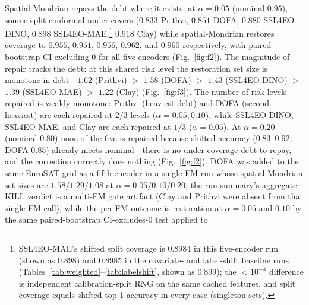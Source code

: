 \documentclass[journal]{IEEEtran}
\renewcommand{\_}{\textunderscore\allowbreak}
\begin{document}
Spatial-Mondrian repays the debt where it exists: at $\alpha=0.05$ (nominal $0.95$), source
split-conformal under-covers ($0.833$ Prithvi, $0.851$ DOFA, $0.880$ SSL4EO-DINO, $0.898$ SSL4EO-MAE,\footnote{%
SSL4EO-MAE's shifted split coverage is $0.8984$ in this five-encoder run (shown as $0.898$) and $0.8985$ in the
covariate- and label-shift baseline runs (Tables~\ref{tab:weighted}--\ref{tab:labelshift}, shown as $0.899$);
the ${<}10^{-4}$ difference is independent calibration-split RNG on the same cached features, and split coverage
equals shifted top-1 accuracy in every case (singleton sets).} $0.918$ Clay)
while spatial-Mondrian restores coverage to $0.955$, $0.951$, $0.956$, $0.962$, and $0.960$ respectively,
with paired-bootstrap CI excluding $0$ for all five encoders (Fig.~\ref{fig:f2}). The magnitude of repair tracks the debt:
at this shared risk level the restoration set size is monotone in debt---$1.62$ (Prithvi) $>$ $1.58$ (DOFA) $>$ $1.43$
(SSL4EO-DINO) $>$ $1.39$ (SSL4EO-MAE) $>$ $1.22$ (Clay) (Fig.~\ref{fig:f3}).
The number of risk levels repaired is weakly monotone: Prithvi (heaviest debt) and DOFA (second-heaviest) are each repaired at $2/3$
levels ($\alpha=0.05,0.10$), while SSL4EO-DINO, SSL4EO-MAE, and Clay are each repaired at $1/3$ ($\alpha=0.05$). At
$\alpha=0.20$ (nominal $0.80$) none of the five is repaired because shifted accuracy ($0.83$--$0.92$, DOFA $0.85$) already meets
nominal---there is no under-coverage debt to repay, and the correction correctly does nothing
(Fig.~\ref{fig:f2}). DOFA was added to the same EuroSAT grid as a fifth encoder in a single-FM run whose
spatial-Mondrian set sizes are $1.58/1.29/1.08$ at $\alpha=0.05/0.10/0.20$; the run summary's aggregate KILL
verdict is a multi-FM gate artifact (Clay and Prithvi were absent from that single-FM call), while the per-FM
outcome is restoration at $\alpha=0.05$ and $0.10$ by the same paired-bootstrap CI-excludes-$0$ test applied to
\end{document}
